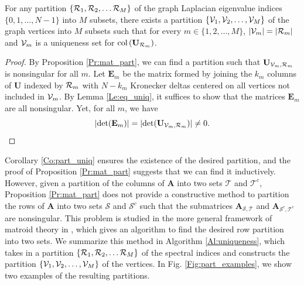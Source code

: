 \documentclass{article}
\begin{document}
\begin{corollary}\label{Co:part_uniq}
For any %
partition $\{{\cal R}_1,{\cal R}_2,\ldots {\cal R}_M \}$ of the graph Laplacian eigenvalue indices $\{0,1,\ldots,N-1\}$ into $M$ subsets, there exists a partition $\{{\mathcal{V}}_1,{\mathcal{V}}_2,\ldots,{\mathcal{V}}_M\}$ of the graph vertices into $M$ subsets 
such that for every $m \in \{1,2,\ldots,M\}$, $|{\mathcal{V}}_m|=|{\cal R}_m|$ and 
${\mathcal{V}}_m$ is a uniqueness set for $\mbox{col}\left(\mathbf{U}_{{\cal R}_m}\right)$.%
\end{corollary}
\begin{proof}
By Proposition \ref{Pr:mat_part}, we can find a partition such that $\mathbf{U}_{{\mathcal{V}}_m,{\cal R}_m}$ is nonsingular for all $m$. Let $\mathbf{E}_m$ be the matrix formed by joining the $k_m$ columns of  $\mathbf{U}$ indexed by ${\cal R}_m$ with $N-k_m$ Kronecker deltas centered on all vertices not included in ${\mathcal{V}}_m$. By Lemma \ref{Le:eq_uniq}, it suffices to show that the matrices $\mathbf{E}_m$ are all nonsingular. Yet, for all $m$, we have
$$|\mbox{det}(\mathbf{E}_m)|=|\mbox{det}(\mathbf{U}_{{\mathcal{V}}_m,{\cal R}_m})| \neq 0.$$
\end{proof}

Corollary \ref{Co:part_uniq} ensures the existence of the desired partition, and the proof of Proposition \ref{Pr:mat_part} suggests that we can find it inductively. However, given a partition of the columns of ${\mathbf{A}}$ into two sets $\mathcal{T}$ and $\mathcal{T}^c$, Proposition \ref{Pr:mat_part} does not provide a constructive method to partition the rows of ${\mathbf{A}}$ into two sets $\mathcal{S}$ and $\mathcal{S}^c$ such that the submatrices ${\mathbf{A}}_{{\mathcal{S}},{\mathcal{T}}}$ and ${\mathbf{A}}_{{\mathcal{S}^c},{\mathcal{T}}^c}$ are nonsingular. This problem is studied in the more general framework of matroid theory in \cite{greene_magnanti}, which gives an algorithm to find the desired row partition into two sets. We summarize this method in Algorithm \ref{Al:uniqueness}, which takes in a partition $\{{\cal R}_1,{\cal R}_2,\ldots {\cal R}_M \}$ of the spectral indices and constructs the partition $\{{\mathcal{V}}_1,{\mathcal{V}}_2,\ldots,{\mathcal{V}}_M\}$ of the vertices. In Fig. \ref{Fig:part_examples}, we show two examples of the resulting partitions.
\end{document}
